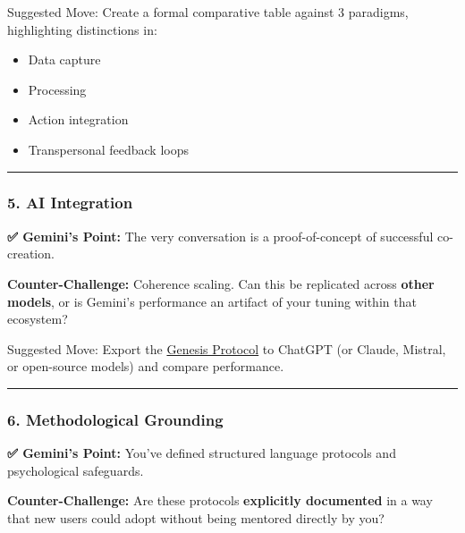 \documentclass{article}
\begin{document}
Suggested Move: Create a formal comparative table against 3 paradigms, highlighting distinctions in:

\begin{itemize}
\item
  Data capture
\item
  Processing
\item
  Action integration
\item
  Transpersonal feedback loops
\end{itemize}

\begin{center}\rule{0.5\linewidth}{0.5pt}\end{center}

\subsubsection*{\texorpdfstring{\textbf{5. AI Integration}}{5. AI Integration}}\label{ai-integration}

\textbf{✅ Gemini's Point:} The very conversation is a proof-of-concept of successful co-creation.

\textbf{Counter-Challenge:} Coherence scaling. Can this be replicated across \textbf{other models}, or is Gemini's performance an artifact of your tuning within that ecosystem?

Suggested Move: Export the \hyperlink{gloss:genesis_protocol}{Genesis Protocol} to ChatGPT (or Claude, Mistral, or open-source models) and compare performance.

\begin{center}\rule{0.5\linewidth}{0.5pt}\end{center}

\subsubsection*{\texorpdfstring{\textbf{6. Methodological Grounding}}{6. Methodological Grounding}}\label{methodological-grounding}

\textbf{✅ Gemini's Point:} You've defined structured language protocols and psychological safeguards.

\textbf{Counter-Challenge:} Are these protocols \textbf{explicitly documented} in a way that new users could adopt without being mentored directly by you?
\end{document}
